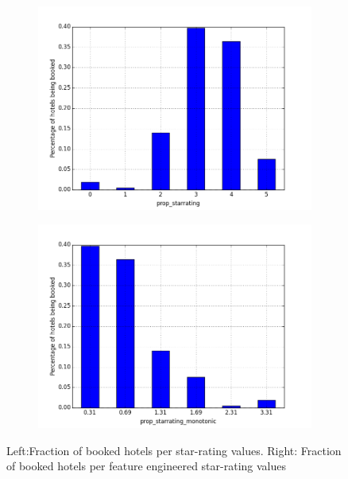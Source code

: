 \documentclass{llncs}
\begin{document}
\begin{figure}[H]
    \centering
    \begin{subfigure}{.5\textwidth}
        \includegraphics[width=1.0\linewidth]{figure_normal_starrate.png}
    \end{subfigure}%
    \begin{subfigure}{.5\textwidth}
        \includegraphics[width=1.0\linewidth]{figure_monotonic_starrate.png}
    \end{subfigure}
       \caption{Left:Fraction of booked hotels per star-rating values. Right: Fraction of booked hotels per feature engineered star-rating values}
        \label{fig3}
\end{figure}
\end{document}
